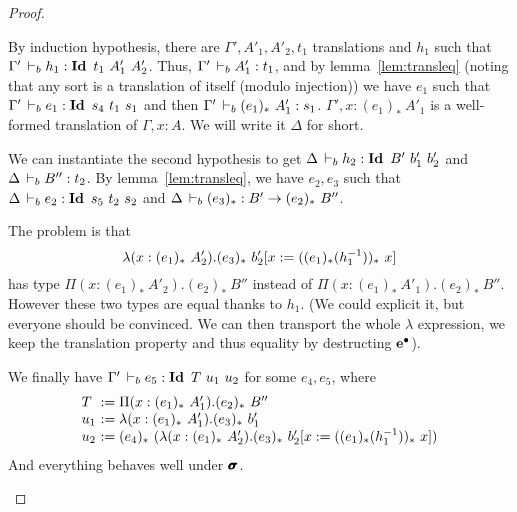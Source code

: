 \documentclass[a4paper,english]{lipics-utf8x}
\begin{document}
\begin{proof}
\begin{caselist}
      \nextcase
      \begin{mathc}
      \end{mathc}
      By induction hypothesis, there are $\Gamma',A'_1,A'_2,t_1$ translations
      and $h_1$ such that $\Gamma' \,\vdash_b h_1 : \operatorname{\mathbf{Id}~} t_1\ A'_1\ A'_2$.
      Thus, $\Gamma' \,\vdash_b A'_1 : t_1$, and by lemma~\ref{lem:transleq}
      (noting that any sort is a translation of itself (modulo injection))
      we have $e_1$ such that $\Gamma' \,\vdash_b e_1 : \operatorname{\mathbf{Id}~} s_4\ t_1\ s_1$ and
      then $\Gamma' \,\vdash_b (e_1)_*\ A'_1 : s_1$.
      $\Gamma', x : (e_1)_*\ A'_1$ is a well-formed translation of
      $\Gamma, x:A$. We will write it $\Delta$ for short.

      We can instantiate the second hypothesis to get
      $\Delta \,\vdash_b h_2 : \operatorname{\mathbf{Id}~} B'\ b'_1\ b'_2$ and $\Delta \,\vdash_b B'' : t_2$.
      By lemma~\ref{lem:transleq}, we have $e_2,e_3$ such that
      $\Delta \,\vdash_b e_2 : \operatorname{\mathbf{Id}~} s_5\ t_2\ s_2$ and
      $\Delta \,\vdash_b (e_3)_* : B' \to (e_2)_*\ B''$.

      The problem is that
      \[
        \lambda (x : (e_1)_*\ A'_2). (e_3)_*\ %
        b'_2[x := ((e_1)_* (h_1\inv))_*\ x]
      \]
      has type
      $\Pi (x : (e_1)_*\ A'_2). (e_2)_*\ B''$ instead of
      $\Pi (x : (e_1)_*\ A'_1). (e_2)_*\ B''$.
      However these two types are equal thanks to $h_1$.
      (We could explicit it, but everyone should be convinced. We can then
      transport the whole $\lambda$ expression, we keep the translation
      property and thus equality by destructing $\operatorname{\operatorname{\mathbf{e}}^\bullet}$).

      We finally have
      $\Gamma' \,\vdash_b e_5 : \operatorname{\mathbf{Id}~} T\ u_1\ u_2$ for some $e_4,e_5$,
      where
      \[
        \begin{array}{l@{~}l}
          T   &:= \Pi (x : (e_1)_*\ A'_1). (e_2)_*\ B'' \\
          u_1 &:= \lambda (x : (e_1)_*\ A'_1). (e_3)_*\ b'_1 \\
          u_2 &:= (e_4)_*\ %
                   (\lambda (x : (e_1)_*\ A'_2).
                    (e_3)_*\ b'_2[x := ((e_1)_* (h_1\inv))_*\ x])
        \end{array}
      \]
      And everything behaves well under $\operatorname{\pmb{\bm{\sigma}}}$.


\end{caselist}
\end{proof}
\end{document}
